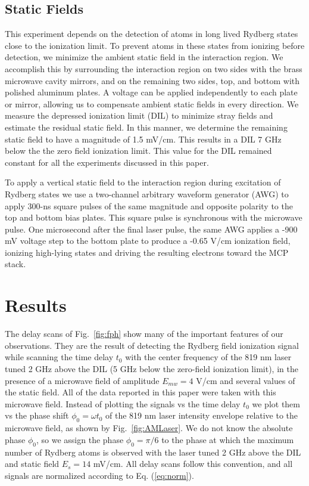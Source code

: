 \documentclass[aps,pra,reprint,groupedaddress]{revtex4-1}
\begin{document}
\subsection{\label{fields} Static Fields}

This experiment depends on the detection of atoms in long lived Rydberg states close to the ionization limit. To prevent atoms in these states from ionizing before detection, we minimize the ambient static field in the interaction region. We accomplish this by surrounding the interaction region on two sides with the brass microwave cavity mirrors, and on the remaining two sides, top, and bottom with polished aluminum plates. A voltage can be applied independently to each plate or mirror, allowing us to compensate ambient static fields in every direction. We measure the depressed ionization limit (DIL) to minimize stray fields and estimate the residual static field. In this manner, we determine the remaining static field to have a magnitude of 1.5 mV/cm. This results in a DIL 7 GHz below the the zero field ionization limit. This value for the DIL remained constant for all the experiments discussed in this paper.

To apply a vertical static field to the interaction region during excitation of Rydberg states we use a two-channel arbitrary waveform generator (AWG) to apply 300-ns square pulses of the same magnitude and opposite polarity to the top and bottom bias plates. This square pulse is synchronous with the microwave pulse. One microsecond after the final laser pulse, the same AWG applies a -900 mV voltage step to the bottom plate to produce a -0.65 V/cm ionization field, ionizing high-lying states and driving the resulting electrons toward the MCP stack.

\section{\label{results} Results}

The delay scans of Fig.~\ref{fig:fph} show many of the important features of our observations. They are the result of detecting the Rydberg field ionization signal while scanning the time delay $t_0$ with the center frequency of the 819 nm laser tuned 2 GHz above the DIL (5 GHz below the zero-field ionization limit), in the presence of a microwave field of amplitude $E_{mw}=4$ V/cm and several values of the static field. All of the data reported in this paper were taken with this microwave field. Instead of plotting the signals vs the time delay $t_0$ we plot them vs the phase shift $\phi_0=\omega t_0$ of the 819 nm laser intensity envelope relative to the microwave field, as shown by Fig.~\ref{fig:AMLaser}. We do not know the absolute phase $\phi_0$, so we assign the phase $\phi_0=\pi/6$ to the phase at which the maximum number of Rydberg atoms is observed with the laser tuned 2 GHz above the DIL and static field $E_s = 14$ mV/cm. All delay scans follow this convention, and all signals are normalized according to Eq. (\ref{eq:norm}).
\end{document}
